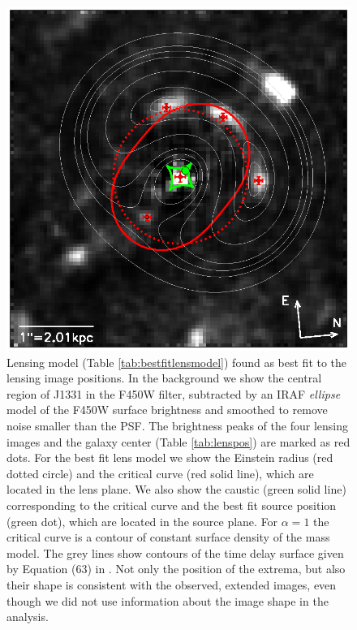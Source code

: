\documentclass[useAMS,usenatbib]{mnras}
\begin{document}
\begin{figure}
\centering
  \includegraphics[width=\linewidth]{fig/lens_all_in_one.ps}
\caption{Lensing model (Table \ref{tab:bestfitlensmodel}) found as best fit to the lensing image positions. In the background we show the central region of J1331 in the F450W filter, subtracted by an IRAF \emph{ellipse} model of the F450W surface brightness and smoothed to remove noise smaller than the PSF. The brightness peaks of the four lensing images and the galaxy center (Table \ref{tab:lenspos}) are marked as red dots. For the best fit lens model we show the Einstein radius (red dotted circle) and the critical curve (red solid line), which are located in the lens plane. We also show the caustic (green solid line) corresponding to the critical curve and the best fit source position (green dot), which are located in the source plane. For $\alpha=1$ the critical curve is a contour of constant surface density of the mass model. The grey  lines show contours of the time delay surface given by Equation (63) in \citet{1996astro.ph..6001N}. Not only the position of the extrema, but also their shape is consistent with the observed, extended images, even though we did not use information about the image shape in the analysis.}
\label{fig:bestfitlensmodel}
\end{figure}
\end{document}

